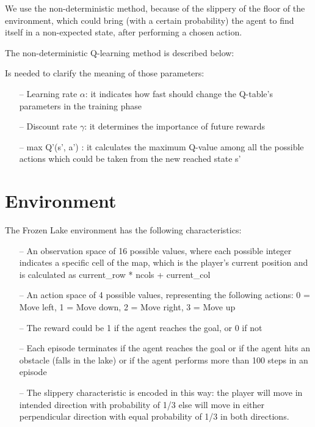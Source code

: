 \documentclass{article}
\begin{document}
We use the non-deterministic method, because of the slippery of the floor of the environment, which could bring (with a certain probability) the agent to find itself in a non-expected state, after performing a chosen action.

The non-deterministic Q-learning method is described below:

\begin{center}
\centering
{}
\end{center}

Is needed to clarify the meaning of those parameters:

\begin{itemize}
\item[--]{Learning rate $\alpha$: it indicates how fast should change the Q-table's parameters in the training phase}
\item[--]{Discount rate $\gamma$: it determines the importance of future rewards}
\item[--] {max Q'(s', a') : it calculates the maximum Q-value among all the possible actions which could be taken from the new reached state s'}
\end{itemize}


\section{Environment}

The Frozen Lake environment has the following characteristics: 
\begin{itemize}
\item[--]{An observation space of 16 possible values, where each possible integer indicates a specific cell of the map, which is the player’s current position and is calculated as current\_row * ncols + current\_col}
\item[--] An action space of 4 possible values, representing the following actions: 0 = Move left, 1 = Move down, 2 = Move right, 3 = Move up
\item[--] The reward could be 1 if the agent reaches the goal, or 0 if not
\item[--] Each episode terminates if the agent reaches the goal or if the agent hits an obstacle (falls in the lake) or if the agent performs more than 100 steps in an episode
\item[--] The slippery characteristic is encoded in this way: the player will move in intended direction with probability of 1/3 else will move in either perpendicular direction with equal probability of 1/3 in both directions.
\end{itemize}
\end{document}
